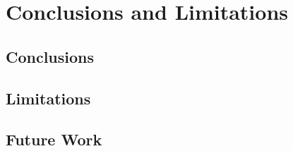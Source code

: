 \chapter{Conclusions and Limitations}
\label{chapt:ConclusionsAndLimitations}

\section{Conclusions}
\section{Limitations}
\section{Future Work}